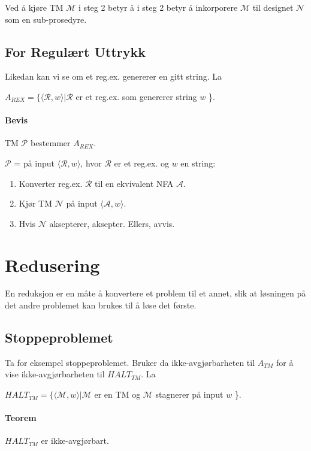 \documentclass[11pt,a4paper]{article}
\begin{document}
Ved å kjøre TM $\mathcal{M}$ i steg 2 betyr å i steg 2 betyr å inkorporere $\mathcal{M}$ til designet $\mathcal{N}$ som en sub-prosedyre.

\subsection{For Regulært Uttrykk}
Likedan kan vi se om et reg.ex. genererer en gitt string. La
\begin{center}
$A_{REX} = \{\langle \mathcal{R},w \rangle | \mathcal{R}$ er et reg.ex. som genererer string $w$ \}.
\end{center}

\paragraph{Bevis} TM $\mathcal{P}$ bestemmer $A_{REX}$.

$\mathcal{P}$ = på input $\langle \mathcal{R},w \rangle$, hvor $\mathcal{R}$ er et reg.ex. og $w$ en string:
\begin{enumerate}
\item{Konverter reg.ex. $\mathcal{R}$ til en ekvivalent NFA $\mathcal{A}$.}
\item{Kjør TM $\mathcal{N}$ på input $\langle \mathcal{A},w \rangle$.}
\item{Hvis $\mathcal{N}$ aksepterer, aksepter. Ellers, avvis.}
\end{enumerate}

\section{Redusering}
En reduksjon er en måte å konvertere et problem til et annet, slik at løsningen på det andre problemet kan brukes til å løse det første.

\subsection{Stoppeproblemet}
Ta for eksempel stoppeproblemet. Bruker da ikke-avgjørbarheten til $A_{TM}$ for å vise ikke-avgjørbarheten til $HALT_{TM}$. La
\begin{center}
$HALT_{TM} = \{\langle \mathcal{M}, w \rangle | \mathcal{M}$ er en TM og $\mathcal{M}$ stagnerer på input $w$ \}.
\end{center}

\paragraph{Teorem} $HALT_{TM}$ er ikke-avgjørbart.
\end{document}
